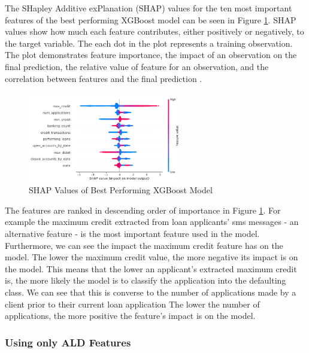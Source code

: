 The SHapley Additive exPlanation (SHAP) values for the ten most important features of the best performing XGBoost model can be seen in Figure \ref{fig:xgb_feats}. SHAP values show how much each feature contributes, either positively or negatively, to the target variable. The each dot in the plot represents a training observation. The plot demonstrates feature importance, the impact of an observation on the final prediction, the relative value of feature for an observation, and the correlation between features and the final prediction \parencite{SHAP}. 

\vspace{10 pt}

\begin{figure}[!htb]
\centering
\includegraphics[width=0.6\textwidth]{images/xgb_feats.png}
\caption{SHAP Values of Best Performing XGBoost Model}
\label{fig:xgb_feats}
\end{figure}

\vspace{10 pt}

The features are ranked in descending order of importance in Figure \ref{fig:xgb_feats}. For example the maximum credit extracted from loan applicants' sms messages - an alternative feature - is the most important feature used in the model. Furthermore, we can see the impact the maximum credit feature has on the model. The lower the maximum credit value, the more negative its impact is on the model. This means that the lower an applicant's extracted maximum credit is, the more likely the model is to classify the application into the defaulting class. We can see that this is converse to the number of applications made by a client prior to their current loan application The lower the number of applications, the more positive the feature's impact is on the model. \\


\subsubsection{Using only ALD Features}

